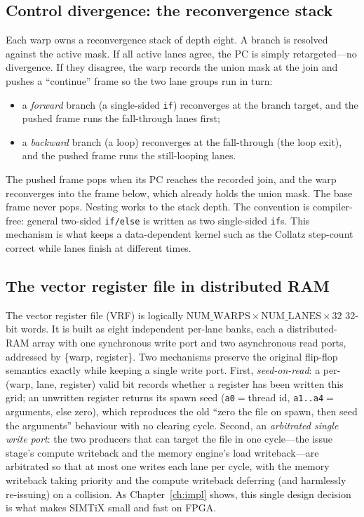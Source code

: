 \documentclass[12pt,a4paper,oneside]{report}
\newcommand{\code}[1]{\texttt{#1}}
\begin{document}
\subsection{Control divergence: the reconvergence stack}
\label{sec:reconv}
Each warp owns a reconvergence stack of depth eight. A branch is resolved against
the active mask. If all active lanes agree, the PC is simply retargeted---no
divergence. If they disagree, the warp records the union mask at the join and
pushes a ``continue'' frame so the two lane groups run in turn:
\begin{itemize}
\item a \emph{forward} branch (a single-sided \code{if}) reconverges at the branch
target, and the pushed frame runs the fall-through lanes first;
\item a \emph{backward} branch (a loop) reconverges at the fall-through (the loop
exit), and the pushed frame runs the still-looping lanes.
\end{itemize}
The pushed frame pops when its PC reaches the recorded join, and the warp
reconverges into the frame below, which already holds the union mask. The base
frame never pops. Nesting works to the stack depth. The convention is
compiler-free: general two-sided \code{if/else} is written as two single-sided
\code{if}s. This mechanism is what keeps a data-dependent kernel such as the
Collatz step-count correct while lanes finish at different times.

\subsection{The vector register file in distributed RAM}
\label{sec:vrf}
The vector register file (VRF) is logically $\mathrm{NUM\_WARPS}\times
\mathrm{NUM\_LANES}\times 32$ 32-bit words. It is built as eight independent
per-lane banks, each a distributed-RAM array with one synchronous write port and
two asynchronous read ports, addressed by \{warp, register\}. Two mechanisms
preserve the original flip-flop semantics exactly while keeping a single write
port. First, \emph{seed-on-read}: a per-(warp, lane, register) valid bit records
whether a register has been written this grid; an unwritten register returns its
spawn seed (\code{a0}$=$thread id, \code{a1..a4}$=$arguments, else zero), which
reproduces the old ``zero the file on spawn, then seed the arguments'' behaviour
with no clearing cycle. Second, an \emph{arbitrated single write port}: the two
producers that can target the file in one cycle---the issue stage's compute
writeback and the memory engine's load writeback---are arbitrated so that at most
one writes each lane per cycle, with the memory writeback taking priority and the
compute writeback deferring (and harmlessly re-issuing) on a collision. As
Chapter~\ref{ch:impl} shows, this single design decision is what makes SIMTiX
small and fast on FPGA.
\end{document}
